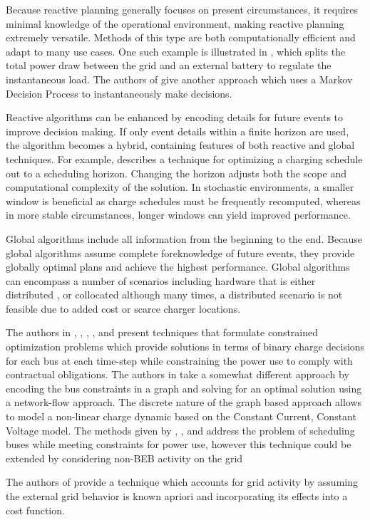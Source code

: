 \par Because reactive planning generally focuses on present circumstances, it requires minimal knowledge of the operational environment, making reactive planning extremely versatile.  Methods of this type are both computationally efficient and adapt to many use cases.  One such example is illustrated in \cite{cheng_smart_2020}, which splits the total power draw between the grid and an external battery to regulate the instantaneous load. The authors of \cite{Wang2019} give another approach which uses a Markov Decision Process to instantaneously make decisions.
\par Reactive algorithms can be enhanced by encoding details for future events to improve decision making. If only event details within a finite horizon are used, the algorithm becomes a hybrid, containing features of both reactive and global techniques. For example, \cite{bagherinezhad_spatio-temporal_2020} describes a technique for optimizing a charging schedule out to a scheduling horizon. Changing the horizon adjusts both the scope and computational complexity of the solution. In stochastic environments, a smaller window is beneficial as charge schedules must be frequently recomputed, whereas in more stable circumstances, longer windows can yield improved performance. 
\par Global algorithms include all information from the beginning to the end. Because global algorithms assume complete foreknowledge of future events, they provide globally optimal plans and achieve the highest performance. Global algorithms can encompass a number of scenarios including hardware that is either distributed \cite{Nimalsiri2020}, or collocated although many times, a distributed scenario is not feasible due to added cost or scarce charger locations.
\par The authors in \cite{el-taweel_incorporation_2019}, \cite{Leou_optimal_2017}, \cite{Wei2018}, \cite{Rinalde_Mixed_2020}, and \cite{He_2019_Fast} present techniques that formulate constrained optimization problems which provide solutions in terms of binary charge decisions for each bus at each time-step while constraining the power use to comply with contractual obligations. The authors in \cite{whitaker_network_2021} take a somewhat different approach by encoding the bus constraints in a graph and solving for an optimal solution using a network-flow approach. The discrete nature of the graph based approach allows \cite{whitaker_network_2021} to model a non-linear charge dynamic based on the Constant Current, Constant Voltage model. The methods given by \cite{el-taweel_incorporation_2019}, \cite{Leou_optimal_2017}, and \cite{whitaker_network_2021} address the problem of scheduling buses while meeting constraints for power use, however this technique could be extended by considering non-BEB activity on the grid
\par The authors of \cite{jahic_preemptive_2019} provide a technique which accounts for grid activity by assuming the external grid behavior is known apriori and incorporating its effects into a cost function.
